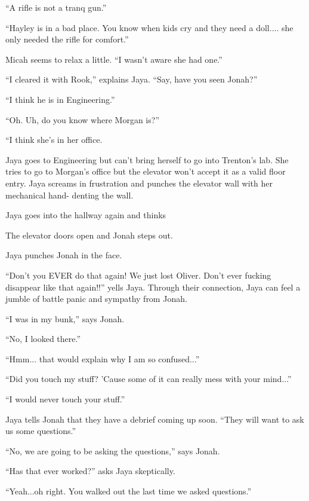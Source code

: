 ``A rifle is not a tranq gun.''

``Hayley is in a bad place.  You know when kids cry and they need a doll.... she only needed the rifle for comfort.''

Micah seems to relax a little. ``I wasn't aware she had one.''

``I cleared it with Rook,'' explains Jaya.  ``Say, have you seen Jonah?''

``I think he is in Engineering.''

``Oh.  Uh, do you know where Morgan is?''

``I think she's in her office.



Jaya goes to Engineering but can't bring herself to go into Trenton's lab.  She tries to go to Morgan's office but the elevator won't accept it as a valid floor entry.  Jaya screams in frustration and punches the elevator wall with her mechanical hand- denting the wall.





Jaya goes into the hallway again and thinks  

The elevator doors open and Jonah steps out.

Jaya punches Jonah in the face.

``Don't you EVER do that again!  We just lost Oliver.  Don't ever fucking disappear like that again!!'' yells Jaya.  Through their connection, Jaya can feel a jumble of battle panic and sympathy from Jonah.

``I was in my bunk,'' says Jonah.

``No, I looked there.''

``Hmm... that would explain why I am so confused...''

``Did you touch my stuff?  'Cause some of it can really mess with your mind...''

``I would never touch your stuff.''



Jaya tells Jonah that they have a debrief coming up soon.  ``They will want to ask us some questions.''

``No, we are going to be asking the questions,'' says Jonah.

``Has that ever worked?'' asks Jaya skeptically.

``Yeah...oh right.  You walked out the last time we asked questions.''

